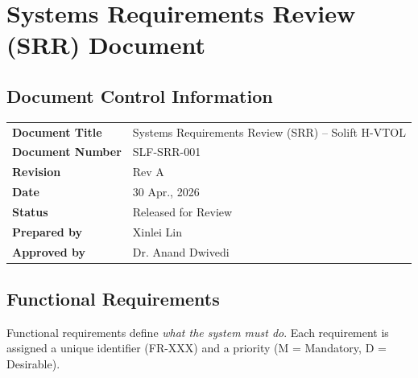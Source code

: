 \chapter{Systems Requirements Review (SRR) Document}

\section{Document Control Information}
\begin{table}[H]
\centering
\begin{tabular}{ll}
\toprule
\textbf{Document Title} & Systems Requirements Review (SRR) -- Solift H-VTOL \\
\textbf{Document Number} & SLF-SRR-001 \\
\textbf{Revision} & Rev A \\
\textbf{Date} & 30 Apr., 2026 \\
\textbf{Status} & Released for Review \\
\textbf{Prepared by} &  Xinlei Lin \\
\textbf{Approved by} & Dr. Anand Dwivedi \\
\bottomrule
\end{tabular}
\end{table}


\section{Functional Requirements}

Functional requirements define \textit{what the system must do}. Each requirement is assigned a unique identifier (FR-XXX) and a priority (M = Mandatory, D = Desirable).

